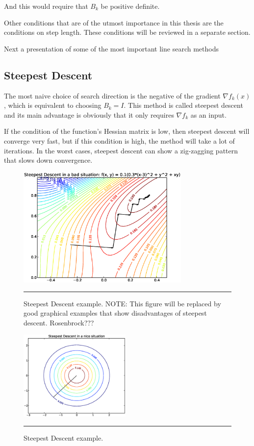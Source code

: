 And this would require that $B_k$ be positive definite.

Other conditions that are of the utmost importance in this thesis are the conditions on step length. These conditions will be reviewed in a separate section. 
 
Next a presentation of some  of the most important line search methods

\subsection{Steepest Descent}

The most naive choice of search direction is the negative of the gradient $\nabla f_k(x)$, which is equivalent to choosing $B_k = I$. This method is called steepest descent and its main advantage is obviously that it only requires $\nabla f_k$ as an input.

If the condition of the function's Hessian matrix is low, then steepest descent will converge very fast,  but if this condition is high, the method will take a lot of iterations. In the worst cases, steepest descent can show a zig-zagging pattern that slows down convergence.

\begin{figure}[htbp]
  \centering
  \includegraphics[width=8.5cm]{Figures/steepestDescentUgly}
  \rule{35em}{0.1pt}
  \caption[step. Desc.]{Steepest Descent example. NOTE: This figure will be replaced by good graphical examples that show disadvantages of steepest descent. Rosenbrock???}
  \label{fig:steepestdescent}
\end{figure}


\begin{figure}[htbp]
  \centering
  \includegraphics[width=5.5cm]{Figures/steepestDescentNice}
  \rule{35em}{0.1pt}
  \caption[step. Desc.]{Steepest Descent example. }
  \label{fig:steepestdescentugly}
\end{figure}

